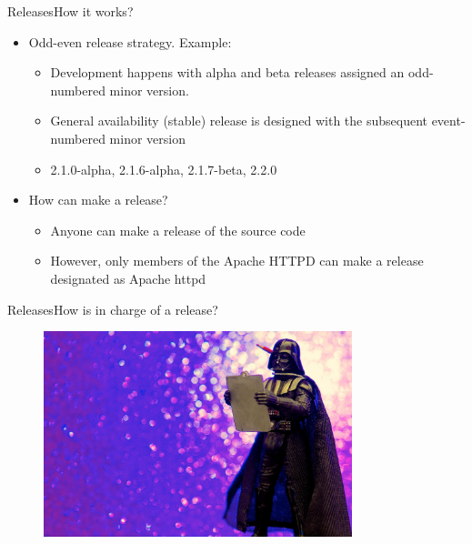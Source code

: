 \documentclass[10pt]{beamer}
\begin{document}
\begin{frame}{Releases}{How it works?}
  \begin{itemize}
    \item Odd-even release strategy. Example: \pause
    \begin{itemize}
      \item Development happens with alpha and beta releases assigned an
            odd-numbered minor version. \pause
      \item General availability (stable) release is designed with the
            subsequent event-numbered minor version \pause
      \item 2.1.0-alpha, 2.1.6-alpha, 2.1.7-beta, 2.2.0 \pause
    \end{itemize}

    \item How can make a release? \pause
      \begin{itemize}
        \item Anyone can make a release of the source code \pause
        \item However, only members of the Apache HTTPD can make a release
              designated as Apache httpd
      \end{itemize}
  \end{itemize}
\end{frame}

\begin{frame}{Releases}{How is in charge of a release?}
  \begin{figure}[ht]
    \centering
    \includegraphics[width=0.8\textwidth, keepaspectratio=true]{images/rm.jpg}
  \end{figure}
\end{frame}
\end{document}
